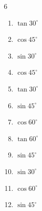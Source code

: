 \begin{multicols}{6}
\begin{enumerate}

\columnbreak %

  \item $\displaystyle \tan{30^\circ}$


  \item $\displaystyle \cos{45^\circ}$


  \item $\displaystyle \sin{30^\circ}$


  \item $\displaystyle \cos{45^\circ}$


  \item $\displaystyle \tan{30^\circ}$


  \item $\displaystyle \sin{45^\circ}$


  \item $\displaystyle \cos{60^\circ}$


  \item $\displaystyle \tan{60^\circ}$


  \item $\displaystyle \sin{45^\circ}$


  \item $\displaystyle \sin{30^\circ}$


  \item $\displaystyle \cos{60^\circ}$


  \item $\displaystyle \sin{45^\circ}$


\end{enumerate}
\end{multicols}
